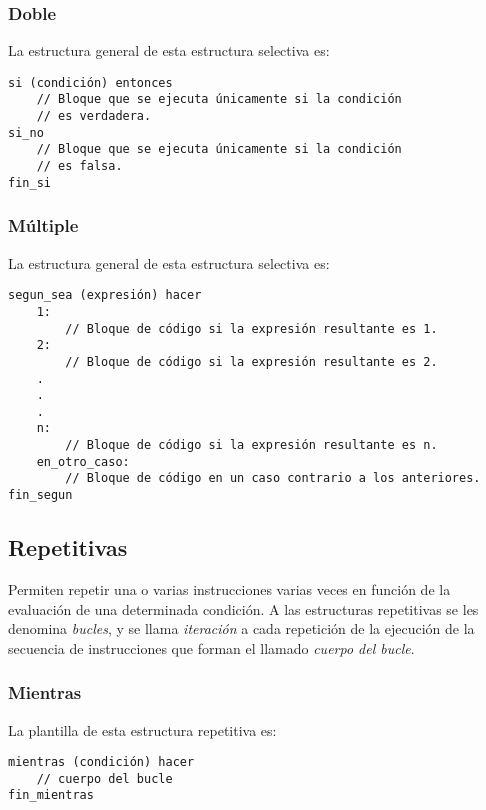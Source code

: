 \documentclass{article}
\begin{document}
\subsubsection{Doble}
La estructura general de esta estructura selectiva es:

\begin{lstlisting}[language = pseudocodigoesp]
si (condición) entonces
    // Bloque que se ejecuta únicamente si la condición
    // es verdadera.
si_no
    // Bloque que se ejecuta únicamente si la condición
    // es falsa.
fin_si
\end{lstlisting}

\subsubsection{Múltiple}

La estructura general de esta estructura selectiva es:

\begin{lstlisting}[language = pseudocodigoesp]
segun_sea (expresión) hacer
    1:
        // Bloque de código si la expresión resultante es 1.
    2:
        // Bloque de código si la expresión resultante es 2.
    .
    .
    .
    n:
        // Bloque de código si la expresión resultante es n.
    en_otro_caso:
        // Bloque de código en un caso contrario a los anteriores.
fin_segun
\end{lstlisting}

\subsection{Repetitivas}

Permiten repetir una o varias instrucciones varias veces en función
de la evaluación de una determinada condición. A las estructuras repetitivas
se les denomina \emph{bucles}, y se llama \emph{iteración} a cada repetición de la
ejecución de la secuencia de instrucciones que forman el llamado
\emph{cuerpo del bucle}. 

\subsubsection{Mientras}

La plantilla de esta estructura repetitiva es:

\begin{lstlisting}[language = pseudocodigoesp]
mientras (condición) hacer
    // cuerpo del bucle
fin_mientras
\end{lstlisting}
\end{document}
